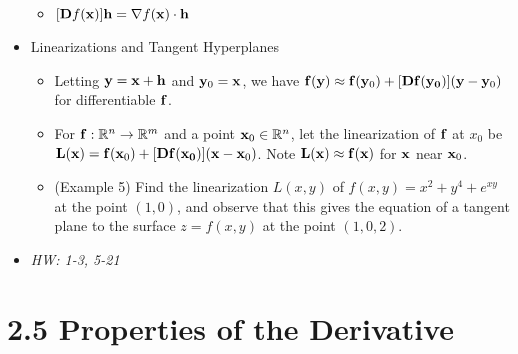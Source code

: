 \documentclass[11pt]{article}
\begin{document}
\begin{itemize}
\begin{itemize}
        \)
      \item
        \(
          [\mathbf{D} f(\mathbf{x})]\mathbf{h}
            =
          \nabla f(\mathbf{x}) \cdot \mathbf{h}
        \)
    \end{itemize}
  \item Linearizations and Tangent Hyperplanes
    \begin{itemize}
      \item Letting \(\mathbf{y} = \mathbf{x}+\mathbf{h}\) and \(\mathbf{y}_0=\mathbf{x}\),
        we have
        \(
          \mathbf{f}(\mathbf{y})
            \approx
          \mathbf{f}(\mathbf{y}_0)+[\mathbf{D}\mathbf{f}(\mathbf{y_0})](\mathbf{y}-\mathbf{y}_0)
        \)
        for differentiable \(\mathbf{f}\).
      \item For \(\mathbf{f}:\mathbb R^n\to\mathbb R^m\) and a point \(\mathbf{x}_0\in\mathbb R^n\),
        let the linearization of \(\mathbf{f}\) at \(x_0\) be
          \(
            \mathbf{L}(\mathbf{x})
              =
            \mathbf{f}(\mathbf{x}_0)+[\mathbf{D}\mathbf{f}(\mathbf{x_0})](\mathbf{x}-\mathbf{x}_0)
          \).
        Note \(\mathbf{L}(\mathbf{x})\approx \mathbf{f}(\mathbf{x})\) for \(\mathbf{x}\) near
        \(\mathbf{x}_0\).
      \item (Example 5) Find the linearization \(L(x,y)\)
        of \(f(x,y)=x^2+y^4+e^{xy}\) at the point \((1,0)\), and observe that this
        gives the equation of a tangent plane to the surface \(z=f(x,y)\)
        at the point \((1,0,2)\).
    \end{itemize}
  \item\textit{
    HW: 1-3, 5-21
  }
\end{itemize}


\section*{2.5 Properties of the Derivative}
\end{document}
